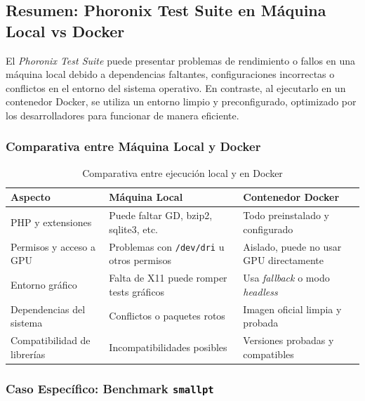 

\subsection{Resumen: Phoronix Test Suite en Máquina Local vs Docker}

El \textit{Phoronix Test Suite} puede presentar problemas de rendimiento o fallos en una máquina local debido a dependencias faltantes, configuraciones incorrectas o conflictos en el entorno del sistema operativo. En contraste, al ejecutarlo en un contenedor Docker, se utiliza un entorno limpio y preconfigurado, optimizado por los desarrolladores para funcionar de manera eficiente.

\subsubsection{Comparativa entre Máquina Local y Docker}

\begin{table}[h!]
\centering
\begin{tabular}{|p{4cm}|p{5cm}|p{5cm}|}
\hline
\textbf{Aspecto} & \textbf{Máquina Local} & \textbf{Contenedor Docker} \\ \hline
PHP y extensiones & Puede faltar GD, bzip2, sqlite3, etc. & Todo preinstalado y configurado \\ \hline
Permisos y acceso a GPU & Problemas con \texttt{/dev/dri} u otros permisos & Aislado, puede no usar GPU directamente \\ \hline
Entorno gráfico & Falta de X11 puede romper tests gráficos & Usa \textit{fallback} o modo \textit{headless} \\ \hline
Dependencias del sistema & Conflictos o paquetes rotos & Imagen oficial limpia y probada \\ \hline
Compatibilidad de librerías & Incompatibilidades posibles & Versiones probadas y compatibles \\ \hline
\end{tabular}
\caption{Comparativa entre ejecución local y en Docker}
\end{table}

\subsubsection{Caso Específico: Benchmark \texttt{smallpt}}

